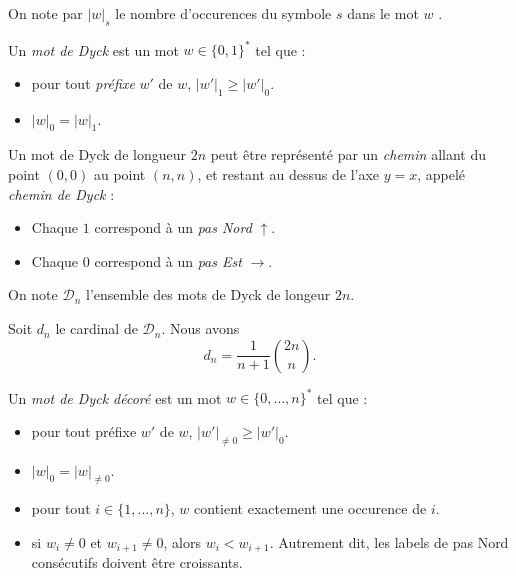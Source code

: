 \begin{notation}
    On note par $|w|_s$ le nombre d'occurences du symbole $s$ dans
    le mot $w$ .
\end{notation}

\begin{definition}
    Un \emph{mot de Dyck} est un mot $w \in \{0,1\}^*$ tel que :
    \begin{itemize}
        \item pour tout \emph{préfixe} $w'$ de $w$,
            $|w'|_1 \geqslant |w'|_0$.
        \item $|w|_0 = |w|_1$.
    \end{itemize}
\end{definition}

Un mot de Dyck de longueur $2n$ peut être représenté par un \emph{chemin}
allant du point $(0,0)$ au point $(n,n)$, et restant au dessus de l'axe
$y = x$, appelé \emph{chemin de Dyck} :
\begin{itemize}
    \item Chaque $1$ correspond à un \emph{pas Nord}
    $\uparrow$. 
    \item Chaque $0$ correspond à un \emph{pas Est}
    $\rightarrow$.
\end{itemize}

On note $\mathcal{D}_n$ l'ensemble des mots de Dyck de longeur $2n$.

\begin{theorem}[André, 1887]
    Soit $d_n$ le cardinal de $\mathcal{D}_n$.
    Nous avons $$d_n = \frac{1}{n + 1} \binom {2n}{n}.$$
\end{theorem}

\begin{definition}
    Un \emph{mot de Dyck décoré} est un mot $w \in 
    \{0, \ldots, n\}^*$ tel que :
    \begin{itemize}
        \item pour tout préfixe $w'$ de $w$,
            $|w'|_{\neq 0} \geqslant |w'|_0$.
        \item $|w|_0 = |w|_{\neq 0}$.
        \item pour tout $i \in \{1, \ldots, n\}$, $w$ contient
            exactement une occurence de $i$.
        \item si $w_i \neq 0$ et $w_{i+1} \neq 0$,
            alors $w_i < w_{i+1}$. Autrement dit, les labels de pas Nord
            consécutifs doivent être croissants.
    \end{itemize}
\end{definition}

